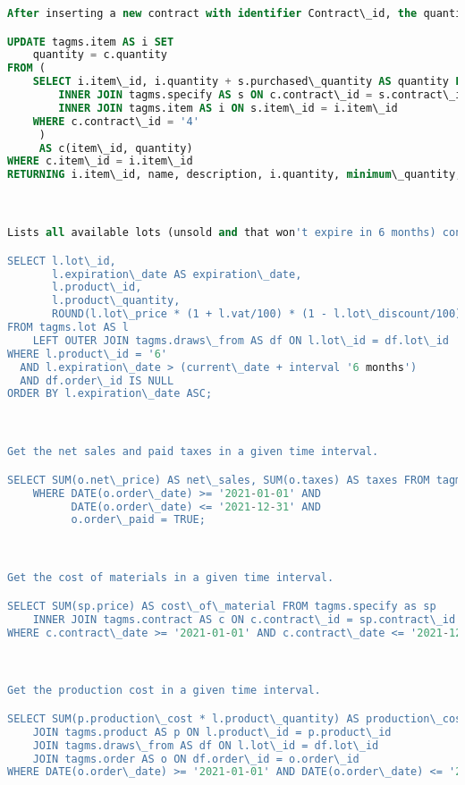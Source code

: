 \begin{lstlisting}[language=SQL,
keywordstyle=\color{blue},
stringstyle=\color{mauve},
showstringspaces=false,
basicstyle=\ttfamily\footnotesize]
After inserting a new contract with identifier Contract\_id, the quantities of items in stock must be incremented in the delivery date.

UPDATE tagms.item AS i SET
    quantity = c.quantity
FROM (
    SELECT i.item\_id, i.quantity + s.purchased\_quantity AS quantity FROM tagms.contract AS c
        INNER JOIN tagms.specify AS s ON c.contract\_id = s.contract\_id
        INNER JOIN tagms.item AS i ON s.item\_id = i.item\_id
    WHERE c.contract\_id = '4'
     )
     AS c(item\_id, quantity)
WHERE c.item\_id = i.item\_id
RETURNING i.item\_id, name, description, i.quantity, minimum\_quantity, item\_category\_id;



Lists all available lots (unsold and that won't expire in 6 months) containing a particular product having a given Product\_id as identifier, sorted by expiration date (oldest lots must be sold first).

SELECT l.lot\_id,
       l.expiration\_date AS expiration\_date,
       l.product\_id,
       l.product\_quantity,
       ROUND(l.lot\_price * (1 + l.vat/100) * (1 - l.lot\_discount/100), 2) AS gross\_price
FROM tagms.lot AS l
    LEFT OUTER JOIN tagms.draws\_from AS df ON l.lot\_id = df.lot\_id
WHERE l.product\_id = '6'
  AND l.expiration\_date > (current\_date + interval '6 months')
  AND df.order\_id IS NULL
ORDER BY l.expiration\_date ASC;



Get the net sales and paid taxes in a given time interval.

SELECT SUM(o.net\_price) AS net\_sales, SUM(o.taxes) AS taxes FROM tagms.order AS o
    WHERE DATE(o.order\_date) >= '2021-01-01' AND
          DATE(o.order\_date) <= '2021-12-31' AND
          o.order\_paid = TRUE;



Get the cost of materials in a given time interval.

SELECT SUM(sp.price) AS cost\_of\_material FROM tagms.specify as sp
    INNER JOIN tagms.contract AS c ON c.contract\_id = sp.contract\_id
WHERE c.contract\_date >= '2021-01-01' AND c.contract\_date <= '2021-12-31';



Get the production cost in a given time interval.

SELECT SUM(p.production\_cost * l.product\_quantity) AS production\_cost FROM tagms.lot AS l
    JOIN tagms.product AS p ON l.product\_id = p.product\_id
    JOIN tagms.draws\_from AS df ON l.lot\_id = df.lot\_id
    JOIN tagms.order AS o ON df.order\_id = o.order\_id
WHERE DATE(o.order\_date) >= '2021-01-01' AND DATE(o.order\_date) <= '2021-12-31';


\end{lstlisting}

